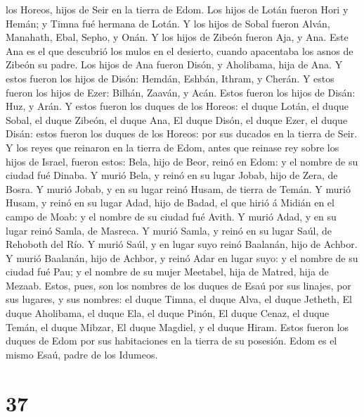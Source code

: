 los Horeos, hijos de Seir en la tierra de Edom.  Los hijos
de Lotán fueron Hori y Hemán; y Timna fué hermana de Lotán.
 Y los hijos de Sobal fueron Alván, Manahath, Ebal, Sepho,
y Onán.  Y los hijos de Zibeón fueron Aja, y Ana. Este Ana
es el que descubrió los mulos en el desierto, cuando apacentaba los
asnos de Zibeón su padre.  Los hijos de Ana fueron Disón, y
Aholibama, hija de Ana.  Y estos fueron los hijos de Disón:
Hemdán, Eshbán, Ithram, y Cherán.  Y estos fueron los hijos
de Ezer: Bilhán, Zaaván, y Acán.  Estos fueron los hijos de
Disán: Huz, y Arán.  Y estos fueron los duques de los
Horeos: el duque Lotán, el duque Sobal, el duque Zibeón, el duque Ana,
 El duque Disón, el duque Ezer, el duque Disán: estos
fueron los duques de los Horeos: por sus ducados en la tierra de Seir.
 Y los reyes que reinaron en la tierra de Edom, antes que
reinase rey sobre los hijos de Israel, fueron estos:  Bela,
hijo de Beor, reinó en Edom: y el nombre de su ciudad fué Dinaba.
 Y murió Bela, y reinó en su lugar Jobab, hijo de Zera, de
Bosra.  Y murió Jobab, y en su lugar reinó Husam, de tierra
de Temán.  Y murió Husam, y reinó en su lugar Adad, hijo de
Badad, el que hirió á Midián en el campo de Moab: y el nombre de su
ciudad fué Avith.  Y murió Adad, y en su lugar reinó Samla,
de Masreca.  Y murió Samla, y reinó en su lugar Saúl, de
Rehoboth del Río.  Y murió Saúl, y en lugar suyo reinó
Baalanán, hijo de Achbor.  Y murió Baalanán, hijo de
Achbor, y reinó Adar en lugar suyo: y el nombre de su ciudad fué Pau; y
el nombre de su mujer Meetabel, hija de Matred, hija de Mezaab.
 Estos, pues, son los nombres de los duques de Esaú por sus
linajes, por sus lugares, y sus nombres: el duque Timna, el duque Alva,
el duque Jetheth,  El duque Aholibama, el duque Ela, el
duque Pinón,  El duque Cenaz, el duque Temán, el duque
Mibzar,  El duque Magdiel, y el duque Hiram. Estos fueron
los duques de Edom por sus habitaciones en la tierra de su posesión.
Edom es el mismo Esaú, padre de los Idumeos.

\hypertarget{section-36}{%
\section{37}\label{section-36}}

